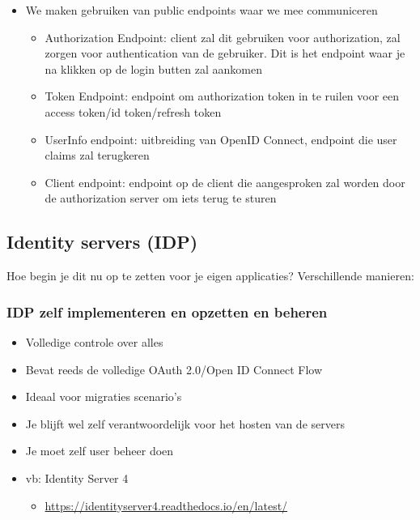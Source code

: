 \documentclass{article}
\begin{document}
\begin{itemize}
    \item We maken gebruiken van public endpoints waar we mee communiceren
    \begin{itemize}
        \item Authorization Endpoint: client zal dit gebruiken voor authorization, zal zorgen voor authentication van de gebruiker. Dit is het endpoint waar je na klikken op de login butten zal aankomen
        \item Token Endpoint: endpoint om authorization token in te ruilen voor een access token/id token/refresh token
        \item UserInfo endpoint: uitbreiding van OpenID Connect, endpoint die user claims zal terugkeren
        \item Client endpoint: endpoint op de client die aangesproken zal worden door de authorization server om iets terug te sturen
    \end{itemize}
\end{itemize}

\subsection{Identity servers (IDP)}

Hoe begin je dit nu op te zetten voor je eigen applicaties? Verschillende manieren:

\subsubsection{IDP zelf implementeren en opzetten en beheren}

\begin{itemize}
    \item Volledige controle over alles
    \item Bevat reeds de volledige OAuth 2.0/Open ID Connect Flow
    \item Ideaal voor migraties scenario’s
    \item Je blijft wel zelf verantwoordelijk voor het hosten van de servers
    \item Je moet zelf user beheer doen
    \item vb: Identity Server 4
    \begin{itemize}
        \item \url{https://identityserver4.readthedocs.io/en/latest/}
    \end{itemize}
\end{itemize}
\end{document}
